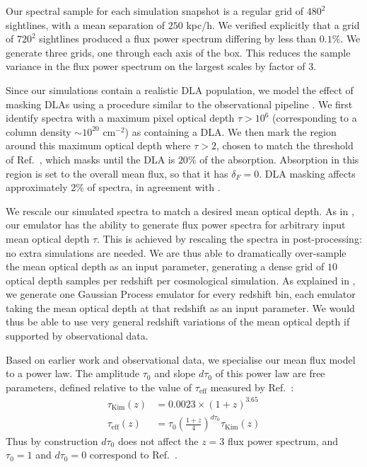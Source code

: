 \documentclass[a4paper,11pt]{article}
\begin{document}
Our spectral sample for each simulation snapshot is a regular grid of $480^2$ sightlines, with a mean separation of $250$ kpc/h. We verified explicitly that a grid of $720^2$ sightlines produced a flux power spectrum differing by less than $0.1\%$. We generate three grids, one through each axis of the box. This reduces the sample variance in the flux power spectrum on the largest scales by factor of $3$.

Since our simulations contain a realistic DLA population, we model the effect of masking DLAs using a procedure similar to the observational pipeline \cite{Chabanier:2020}. We first identify spectra with a maximum pixel optical depth $\tau > 10^6$ (corresponding to a column density $\sim 10^{20}$ cm$^{-2}$) as containing a DLA. We then mark the region around this maximum optical depth where $\tau > 2$, chosen to match the threshold of Ref.~\cite{Chabanier:2020}, which masks until the DLA is $20\%$ of the absorption. Absorption in this region is set to the overall mean flux, so that it has $\delta_F = 0$. DLA masking affects approximately $2\%$ of spectra, in agreement with \cite{Rogers:2019}.

We rescale our simulated spectra to match a desired mean optical depth. As in \cite{Bird:2019}, our emulator has the ability to generate flux power spectra for arbitrary input mean optical depth $\tau$. This is achieved by rescaling the spectra in post-processing: no extra simulations are needed. We are thus able to dramatically over-sample the mean optical depth as an input parameter, generating a dense grid of $10$ optical depth samples per redshift per cosmological simulation. As explained in \cite{Bird:2019}, we generate one Gaussian Process emulator for every redshift bin, each emulator taking the mean optical depth at that redshift as an input parameter. We would thus be able to use very general redshift variations of the mean optical depth if supported by observational data.

Based on earlier work and observational data, we specialise our mean flux model to a power law. The amplitude $\tau_0$ and slope $d\tau_0$ of this power law are free parameters, defined relative to the value of $\tau_\mathrm{eff}$ measured by Ref.~\cite{Kim:2007}:
\begin{align}
\tau_\mathrm{Kim}(z) &= 0.0023 \times (1 + z)^{3.65} \\
 \tau_\mathrm{eff}(z) &= \tau_0 \left(\frac{1+z}{4}\right)^{d\tau_0}  \tau_\mathrm{Kim}(z)
 \label{eq:meanflux}
\end{align}
Thus by construction $d\tau_0$ does not affect the $z=3$ flux power spectrum, and $\tau_0 = 1$ and $d\tau_0 = 0$ correspond to Ref.~\cite{Kim:2007}.
\end{document}
